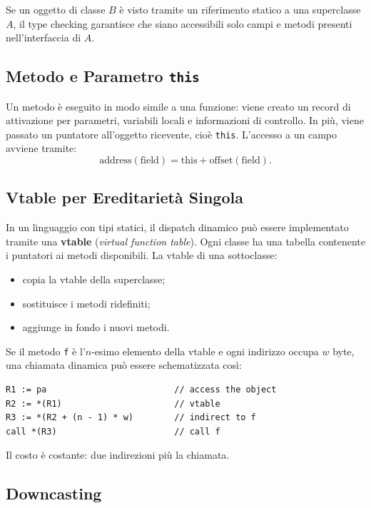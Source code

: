\documentclass{article}
\begin{document}
Se un oggetto di classe $B$ è visto tramite un riferimento statico a una superclasse $A$, il type checking garantisce che siano accessibili solo campi e metodi presenti nell'interfaccia di $A$.

\subsection{Metodo e Parametro \texttt{this}}

Un metodo è eseguito in modo simile a una funzione: viene creato un record di attivazione per parametri, variabili locali e informazioni di controllo. In più, viene passato un puntatore all'oggetto ricevente, cioè \texttt{this}. L'accesso a un campo avviene tramite:
\[
\mathrm{address}(\mathrm{field}) =
\mathrm{this} + \mathrm{offset}(\mathrm{field}).
\]

\subsection{Vtable per Ereditarietà Singola}

In un linguaggio con tipi statici, il dispatch dinamico può essere implementato tramite una \textbf{vtable} (\textit{virtual function table}). Ogni classe ha una tabella contenente i puntatori ai metodi disponibili. La vtable di una sottoclasse:
\begin{itemize}
  \item copia la vtable della superclasse;
  \item sostituisce i metodi ridefiniti;
  \item aggiunge in fondo i nuovi metodi.
\end{itemize}

Se il metodo \texttt{f} è l'$n$-esimo elemento della vtable e ogni indirizzo occupa $w$ byte, una chiamata dinamica può essere schematizzata così:

\begin{lstlisting}
R1 := pa                         // access the object
R2 := *(R1)                      // vtable
R3 := *(R2 + (n - 1) * w)        // indirect to f
call *(R3)                       // call f
\end{lstlisting}

Il costo è costante: due indirezioni più la chiamata.

\subsection{Downcasting}
\end{document}
